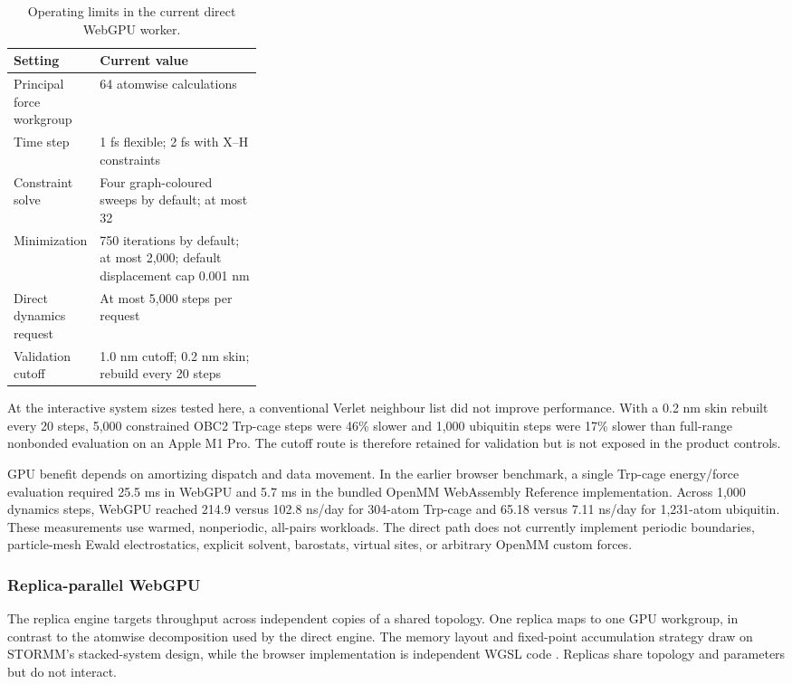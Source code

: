 \documentclass[11pt]{article}
\begin{document}
\begin{small}
\begin{table}[htbp]
\centering\small
\caption{Operating limits in the current direct WebGPU worker.}
\label{tab:appA_webgpu_limits}
\begin{tabularx}{0.95\linewidth}{@{}p{0.32\linewidth}X@{}}
\toprule
\textbf{Setting} & \textbf{Current value}\\
\midrule
Principal force workgroup & 64 atomwise calculations\\
Time step & 1 fs flexible; 2 fs with X--H constraints\\
Constraint solve & Four graph-coloured sweeps by default; at most 32\\
Minimization & 750 iterations by default; at most 2,000; default displacement cap 0.001 nm\\
Direct dynamics request & At most 5,000 steps per request\\
Validation cutoff & 1.0 nm cutoff; 0.2 nm skin; rebuild every 20 steps\\
\bottomrule
\end{tabularx}
\end{table}

At the interactive system sizes tested here, a conventional Verlet neighbour list did not improve performance. With a 0.2 nm skin rebuilt every 20 steps, 5,000 constrained OBC2 Trp-cage steps were 46\% slower and 1,000 ubiquitin steps were 17\% slower than full-range nonbonded evaluation on an Apple M1 Pro. The cutoff route is therefore retained for validation but is not exposed in the product controls.

GPU benefit depends on amortizing dispatch and data movement. In the earlier browser benchmark, a single Trp-cage energy/force evaluation required 25.5 ms in WebGPU and 5.7 ms in the bundled OpenMM WebAssembly Reference implementation. Across 1,000 dynamics steps, WebGPU reached 214.9 versus 102.8 ns/day for 304-atom Trp-cage and 65.18 versus 7.11 ns/day for 1,231-atom ubiquitin. These measurements use warmed, nonperiodic, all-pairs workloads. The direct path does not currently implement periodic boundaries, particle-mesh Ewald electrostatics, explicit solvent, barostats, virtual sites, or arbitrary OpenMM custom forces.

\subsubsection{Replica-parallel WebGPU}

The replica engine targets throughput across independent copies of a shared topology. One replica maps to one GPU workgroup, in contrast to the atomwise decomposition used by the direct engine. The memory layout and fixed-point accumulation strategy draw on STORMM's stacked-system design, while the browser implementation is independent WGSL code \citep{cerutti2024stormm}. Replicas share topology and parameters but do not interact.


\end{small}
\end{document}

